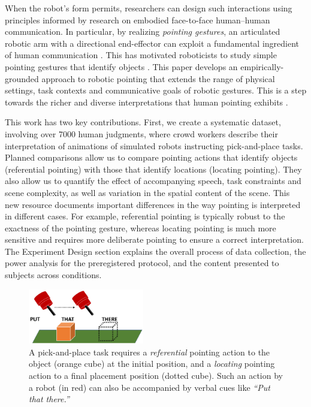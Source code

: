 \documentclass[letterpaper]{article} %
\begin{document}
When the robot's form permits, researchers can design such interactions using principles informed by research on embodied face-to-face human--human communication.  In particular, by realizing \emph{pointing gestures}, an articulated robotic arm with a directional end-effector can exploit a fundamental ingredient of human communication \cite{kita2003pointing}.  This has motivated roboticists to study simple pointing gestures that identify objects \cite{han2018placing,holladay2014legible,zhao2016experimental}.   This paper develops an empirically-grounded approach to robotic pointing that extends the range of physical settings, task contexts and communicative goals of robotic gestures. This is a step towards the richer and diverse interpretations that human pointing exhibits \cite{kendon:2004}.


This work has two key contributions.  First, we create a systematic dataset, involving over 7000 human judgments, where crowd workers describe their interpretation of animations of simulated robots instructing pick-and-place tasks.  Planned comparisons allow us to compare pointing actions that identify objects (referential pointing) with those that identify locations (locating pointing). They also allow us to quantify the effect of accompanying speech, task constraints and scene complexity, as well as variation in the spatial content of the scene.  This new resource documents important differences in the way pointing is interpreted in different cases.  For example, referential pointing is typically robust to the exactness of the pointing gesture, whereas locating pointing is much more sensitive and requires more deliberate pointing to ensure a correct interpretation.  The Experiment Design section explains the overall process of data collection, the power analysis for the preregistered protocol, and the content presented to subjects across conditions. 

\begin{figure}[t]
    \centering
    \includegraphics[width=0.45\textwidth]{putthatthere2.png}
    \caption{A pick-and-place task requires a \textit{referential} pointing action to the object (orange cube) at the initial position, and a \textit{locating} pointing action to a final placement position (dotted cube). Such an action by a robot (in red) can also be accompanied by verbal cues like \textit{``Put that there.''}}
    \label{fig:pap}
\end{figure}
\end{document}
